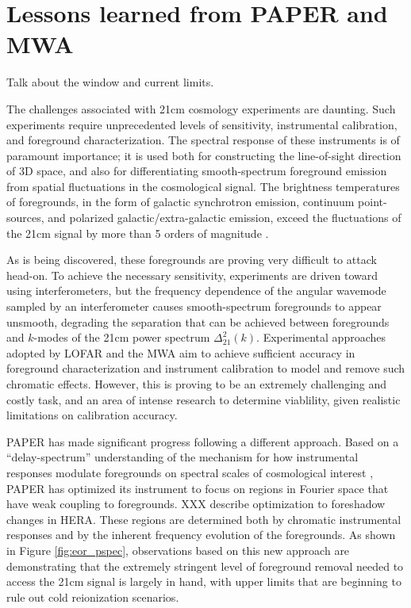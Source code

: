 \documentclass[preprint]{aastex}
\begin{document}
\vspace{-0.25in}
\section{Lessons learned from PAPER and MWA}
\label{LessonsSec}

Talk about the window and current limits.

The challenges associated with 21cm cosmology experiments are daunting.  Such
experiments require unprecedented levels of sensitivity, instrumental
calibration, and foreground characterization.  The spectral response of these
instruments is of paramount importance; it is used both for constructing the
line-of-sight direction of 3D space, and also for differentiating
smooth-spectrum foreground emission from spatial fluctuations in the
cosmological signal. The brightness temperatures of foregrounds, in the form of
galactic synchrotron emission, continuum point-sources, and polarized
galactic/extra-galactic emission, exceed the fluctuations of the 21cm signal by
more than 5 orders of magnitude
\citep{santos_et_al2005,pritchard_loeb2012,pober_et_al2013b}.

As is being discovered, these foregrounds are proving very difficult to attack
head-on.  To achieve the necessary sensitivity, experiments are driven toward
using interferometers, but the frequency dependence of the angular wavemode
sampled by an interferometer causes smooth-spectrum foregrounds to appear
unsmooth, degrading the separation that can be achieved between foregrounds and
$k$-modes of the 21cm power spectrum $\Delta^2_{21}(k)$.  
Experimental approaches adopted by LOFAR and the MWA aim to achieve sufficient
accuracy in foreground characterization and instrument calibration to model and
remove such chromatic effects.  However, this is proving to be an extremely
challenging and costly task, and an area of intense research to determine 
viablility, given realistic limitations on calibration accuracy.

PAPER has made significant progress following a different approach.  Based on a
``delay-spectrum'' understanding of the mechanism for how instrumental
responses modulate foregrounds on spectral scales of cosmological interest
\citep{parsons_et_al2012b}, PAPER has optimized its instrument to focus on
regions in Fourier space that have weak coupling to foregrounds. XXX describe
optimization to foreshadow changes in HERA.  These regions are determined both
by chromatic instrumental responses and by the inherent frequency evolution of
the foregrounds.  As shown in Figure \ref{fig:eor_pspec}, observations based on
this new approach are demonstrating that the extremely stringent level of
foreground removal needed to access the 21cm signal is largely in hand, with
upper limits that are beginning to rule out cold reionization scenarios.
\end{document}
